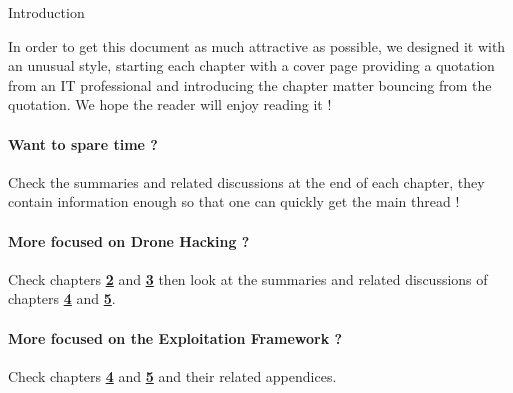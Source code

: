 \begin{chaptercover}{Introduction}
\begin{tip}
In order to get this document as much attractive as possible, we designed it with an unusual style, starting each chapter with a cover page providing a quotation from an IT professional and introducing the chapter matter bouncing from the quotation. We hope the reader will enjoy reading it !

\paragraph{Want to spare time ?} \hfill

Check the summaries and related discussions at the end of each chapter, they contain information enough so that one can quickly get the main thread !

\paragraph{More focused on Drone Hacking ?} \hfill

Check chapters \hyperref[background]{\color{FirstBlue}\bfseries 2} and \hyperref[scope]{\color{FirstBlue}\bfseries 3} then look at the summaries and related discussions of chapters \hyperref[exploits]{\color{FirstBlue}\bfseries 4} and \hyperref[framework]{\color{FirstBlue}\bfseries 5}.

\paragraph{More focused on the Exploitation Framework ?} \hfill

Check chapters \hyperref[exploits]{\color{FirstBlue}\bfseries 4} and \hyperref[framework]{\color{FirstBlue}\bfseries 5} and their related appendices.
\end{tip}

\end{chaptercover}
